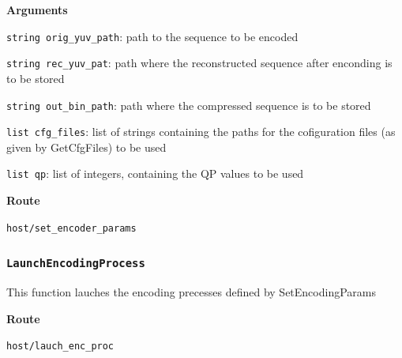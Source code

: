 \documentclass{article}
\begin{document}
\textbf{Arguments}

\texttt{string orig_yuv_path}: path to the sequence to be encoded

\texttt{string rec_yuv_pat}: path where the reconstructed sequence after enconding is to be stored
        
\texttt{string out_bin_path}: path where the compressed sequence is to be stored
        
\texttt{list cfg_files}: list of strings containing the paths for the cofiguration files (as given by GetCfgFiles) to be used

\texttt{list qp}: list of integers, containing the QP values to be used

\textbf{Route}

\texttt{host/set_encoder_params}


\subsubsection*{\texttt{LaunchEncodingProcess}}

This function lauches the encoding precesses defined by SetEncodingParams

\textbf{Route}

\texttt{host/lauch_enc_proc}

\end{document}
